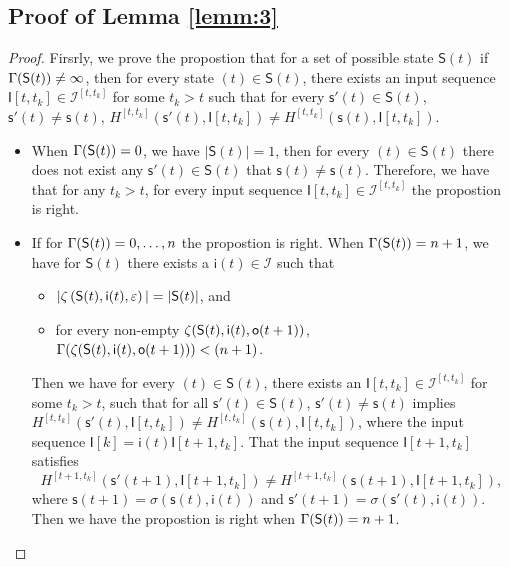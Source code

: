 \begin{appendices}
\subsection{Proof of Lemma \ref{lemm:3}}
\begin{proof} Firsrly, we prove the propostion that for a set of possible state $\mathsf{S}(t)$ if $\Gamma(\mathsf{S}(t))\ne\infty$, then for every state \State$(t)\in \mathsf{S}(t)$, there exists an input sequence $\mathsf{I}[t,t_k]\in\mathcal{I}^{[t,t_k]}$ for some $t_k >t$ such that for every $\mathsf{s}'(t)\in \mathsf{S}(t)$, $\mathsf{s}'(t)\neq \mathsf{s}(t)$, $H^{[t,t_k]}(\mathsf{s}'(t),\mathsf{I}[t,t_k])\neq H^{[t,t_k]}(\mathsf{s}(t), \mathsf{I}[t,t_k])$.
\begin{itemize}
\item When $\Gamma(\mathsf{S}(t))=0$, we have $|\mathsf{S}(t)|=1$, then for every \State$(t)$$\in \mathsf{S}(t)$ there does not exist any $\mathsf{s}'(t)\in \mathsf{S}(t)$ that $\mathsf{s}(t)\neq \mathsf{s}(t)$. Therefore, we have that for any $t_k >t$, for every input sequence $\mathsf{I}[t,t_k]\in\mathcal{I}^{[t,t_k]}$ the propostion is right. 
\item If for $\Gamma(\mathsf{S}(t))=0,\ldots, n$ the propostion is right. When $\Gamma(\mathsf{S}(t))=n+1$, we have for $\mathsf{S}(t)$ there exists a $\mathsf{i}(t)\in \mathcal{I}$ such that
 \begin{itemize}
 \item  $|\zeta\left(\mathsf{S}(t),\mathsf{i}(t),\varepsilon\right)|=|\mathsf{S}(t)|$, and 
 \item  for every non-empty $\zeta(\mathsf{S}(t),\mathsf{i}(t),\mathsf{o}(t+1))$, $\Gamma(\zeta(\mathsf{S}(t),\mathsf{i}(t),\mathsf{o}(t+1)))<(n+1)$.
 \end{itemize}
 Then we have for every \State$(t)$$\in \mathsf{S}(t)$, there exists an $\mathsf{I}[t,t_k]\in\mathcal{I}^{[t,t_k]}$ for some $t_k >t$, such that for all $\mathsf{s}'(t)\in \mathsf{S}(t)$, $\mathsf{s}'(t)\neq \mathsf{s}(t)$ implies $H^{[t,t_k]}(\mathsf{s}'(t),\mathsf{I}[t,t_k])\neq H^{[t,t_k]}(\mathsf{s}(t), \mathsf{I}[t,t_k])$, where the input sequence $\mathsf{I}[k]=\mathsf{i}(t)\mathsf{I}[t+1,t_k]$. That the input sequence $\mathsf{I}[t+1,t_k]$ satisfies %
  \[H^{[t+1,t_k]}(\mathsf{s}'(t+1),\mathsf{I}[t+1,t_k])\neq H^{[t+1,t_k]}(\mathsf{s}(t+1), \mathsf{I}[t+1,t_k]),\] where $\mathsf{s}(t+1)=\sigma(\mathsf{s}(t),\mathsf{i}(t))$ and $\mathsf{s}'(t+1)=\sigma(\mathsf{s}'(t),\mathsf{i}(t))$. Then we have the propostion is right when $\Gamma(\mathsf{S}(t))=n+1$. 


\end{itemize}
\end{proof}
\end{appendices}
